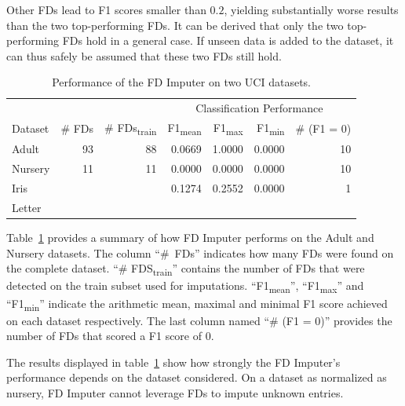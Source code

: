 Other FDs lead to F1 scores smaller than \( 0.2\), yielding substantially worse results than the two top-performing FDs.
It can be derived that only the two top-performing FDs hold in a general case.
If unseen data is added to the dataset, it can thus safely be assumed that these two FDs still hold.

\begin{table}[ht]
    \centering
    \begin{tabular}{lrrrrrr}
        \toprule
        & & & \multicolumn{4}{c}{Classification Performance} \\
        \cmidrule(lr{.25em}){4-7}
        Dataset & \# FDs & \# FDs\textsubscript{train} & F1\textsubscript{mean} & F1\textsubscript{max} & F1\textsubscript{min} & \# (F1 = 0) \\
        \midrule
        Adult & 93 & 88 & 0.0669 & 1.0000 & 0.0000 & 10 \\
        Nursery & 11 & 11 & 0.0000 & 0.0000 & 0.0000 & 10 \\
        Iris & & & 0.1274 & 0.2552 & 0.0000 & 1 \\
        Letter & & & & & & \\
        \bottomrule
    \end{tabular}
    \caption{Performance of the FD Imputer on two UCI datasets.}\label{tab:fd-imputer-performance}
\end{table}

Table~\ref{tab:fd-imputer-performance} provides a summary of how FD Imputer performs on the Adult and Nursery datasets.
The column ``\#~FDs'' indicates how many FDs were found on the complete dataset.
``\# FDS\textsubscript{train}'' contains the number of FDs that were detected on the train subset used for imputations.
``F1\textsubscript{mean}'', ``F1\textsubscript{max}'' and ``F1\textsubscript{min}'' indicate the arithmetic mean, maximal and minimal F1 score achieved on each dataset respectively.
The last column named ``\# (F1 = 0)'' provides the number of FDs that scored a F1 score of 0.

The results displayed in table~\ref{tab:fd-imputer-performance} show how strongly the FD Imputer's performance depends on the dataset considered.
On a dataset as normalized as nursery, FD Imputer cannot leverage FDs to impute unknown entries.

